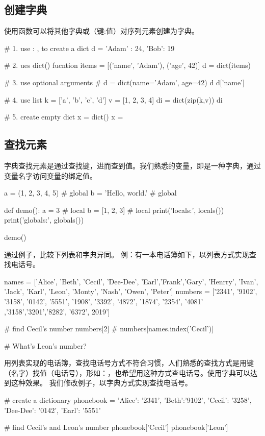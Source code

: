 \subsection{创建字典}
使用函数可以将其他字典或（键:值）对序列元素创建为字典。
\begin{python}
  # 1. use {} : , to create a dict
  d = {'Adam' : 24, 'Bob': 19}

  # 2. ues dict() fucntion
  items = [('name', 'Adam'), ('age', 42)]
  d = dict(items)

  # 3. use optional arguments
  # d = dict(name='Adam', age=42) 
  d
  d['name']

  # 4. use list
  k = ['a', 'b', 'c', 'd']
  v = [1, 2, 3, 4]
  di = dict(zip(k,v))
  di

  # 5. create empty dict
  x = dict()
  x = {}
\end{python}
\subsection{查找元素}
字典查找元素是通过查找键，进而查到值。我们熟悉的变量，即是一种字典，通过变量名字访问变量的绑定值。
\begin{python}
a = (1, 2, 3, 4, 5)  #  global
b = 'Hello, world.'  #  global

def demo():
    a = 3            #  local
    b = [1, 2, 3]    #  local
    print('locals:', locals())
    print('globals:', globals())

demo()
\end{python}
通过例子，比较下列表和字典异同。 例：有一本电话簿如下，以列表方式实现查找电话号。
\begin{python}
  names = ['Alice', 'Beth', 'Cecil', 'Dee-Dee', 'Earl','Frank','Gary',
  'Henrry', 'Ivan', 'Jack', 'Karl', 'Leon', 'Monty', 'Nash', 'Owen', 'Peter']
  numbers = ['2341', '9102', '3158', '0142', '5551', '1908', '3392',
  '4872', '1874', '2354', '4081' ,'3158','3201','8282', '6372', 2019']

# find Cecil's number
numbers[2]  # numbers[names.index('Cecil')]

# What's Leon's number?
\end{python}
用列表实现的电话簿，查找电话号方式不符合习惯，人们熟悉的查找方式是用键（名字）找值（电话号），形如：，也希望用这种方式查电话号。使用字典可以达到这种效果。
我们修改例子，以字典方式实现查找电话号。
\begin{python}
  # create a dictionary
  phonebook = {'Alice': '2341', 'Beth':'9102',
    'Cecil': '3258', 'Dee-Dee': '0142', 'Earl': '5551'}

  # find Cecil's and Leon's number
  phonebook['Cecil']
  phonebook['Leon']
\end{python}
